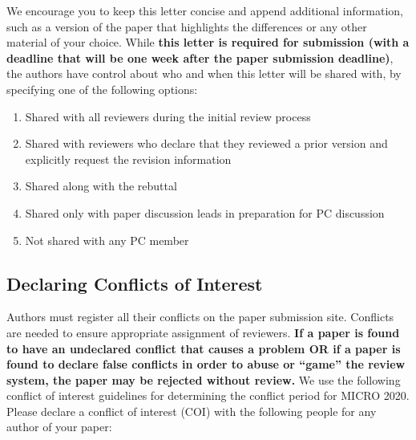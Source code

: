 \documentclass{sig-alternate}
\begin{document}
We encourage you to keep this letter concise and append additional information, such as a version of the paper that highlights the differences or any other material of your choice. While {\bf this letter is required for submission (with a deadline that will be one week after the paper submission deadline)}, the authors have control about who and when this letter will be shared with, by specifying one of the following options:

\begin{enumerate}
\item Shared with all reviewers during the initial review process
\item Shared with reviewers who declare that they reviewed a prior version and explicitly request the revision information
\item Shared along with the rebuttal
\item Shared only with paper discussion leads in preparation for PC discussion
\item Not shared with any PC member 
\end{enumerate}

\subsection{Declaring Conflicts of Interest}
Authors must register all their conflicts on the paper submission site. Conflicts are needed to ensure appropriate assignment of reviewers. {\bf If a paper is found to have an undeclared conflict that causes a problem OR if a paper is found to declare false conflicts in order to abuse or ``game'' the review system, the paper may be rejected without review.} We use the following conflict of interest guidelines for determining the conflict period for MICRO 2020.  Please declare a conflict of interest (COI) with the following people for any author of your paper:
\end{document}
